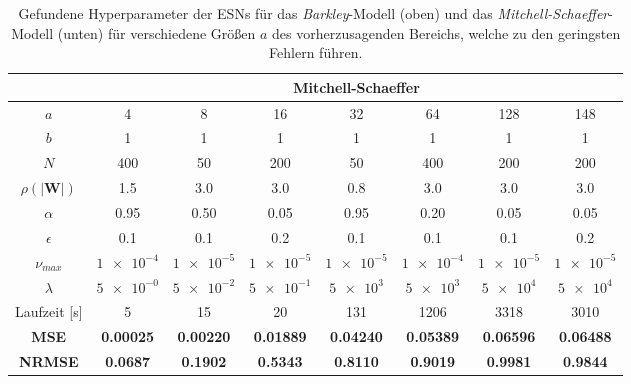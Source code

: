 \begin{table}[h]
	\begin{tabular}{|c|c|c|c|c|c|c|c|}
		\multicolumn{1}{c|}{} & \multicolumn{7}{c|}{Mitchell-Schaeffer}\\ 
		\hline \hline 
		\rule[-1ex]{0pt}{2.5ex} $a$ & 4 & 8 & 16 & 32 & 64 & 128 & 148\\ 
		\hline 
		\rule[-1ex]{0pt}{2.5ex} $b$ & 1 & 1 & 1 & 1 & 1 & 1 & 1 \\ 
		\hline 
		\rule[-1ex]{0pt}{3.5ex} $N$ & 400 & 50 & 200 & 50 & 400 & 200 & 200\\ 
		\hline 
		\rule[-1ex]{0pt}{3.5ex} $\rho(|\mathbf{W}|)$ & 1.5 & 3.0 & 3.0 & 0.8 & 3.0 & 3.0 & 3.0\\ 
		\hline 
		\rule[-1ex]{0pt}{3.5ex} $\alpha$ & 0.95 & 0.50 & 0.05 & 0.95 & 0.20 & 0.05 & 0.05 \\ 
		\hline 
		\rule[-1ex]{0pt}{3.5ex} $\epsilon$ & 0.1 & 0.1 & 0.2 & 0.1 & 0.1 & 0.1 & 0.2 \\ 
		\hline 
		\rule[-1ex]{0pt}{3.5ex} $\nu_{max}$ & $\num{1e-4}$ & $\num{1e-5}$ & $\num{1e-5}$ & $\num{1e-5}$ & $\num{1e-4}$ & $\num{1e-5}$ &  $\num{1e-5}$\\ 
		\hline 
		\rule[-1ex]{0pt}{3.5ex} $\lambda$ & $\num{5e-0}$ & $\num{5e-2}$ & $\num{5e-1}$ & $\num{5e+3}$ & $\num{5e+3}$ & $\num{5e+4}$ & $\num{5e+4}$\\ 		
		\hline 
		\rule[-1ex]{0pt}{2.5ex} Laufzeit [s] & 5 & 15 & 20 & 131 & 1206 & 3318 & 3010\\
		\hline 
		\rule[-1ex]{0pt}{2.5ex} \textbf{MSE} & \textbf{0.00025} & \textbf{0.00220} & \textbf{0.01889} & \textbf{0.04240} & \textbf{0.05389} & \textbf{0.06596} & \textbf{0.06488}\\ 
		\hline 
		\rule[-1ex]{0pt}{2.5ex} \textbf{NRMSE} & \textbf{0.0687} & \textbf{0.1902} & \textbf{0.5343} & \textbf{0.8110} & \textbf{0.9019} & \textbf{0.9981} & \textbf{0.9844} \\ 
		\hline 
	\end{tabular} 

	\caption{Gefundene Hyperparameter der \textsc{ESN}s für das \textit{Barkley}-Modell (oben) und das \textit{Mitchell-Schaeffer}-Modell (unten) für verschiedene Größen $a$ des vorherzusagenden Bereichs, welche zu den geringsten Fehlern führen.}
\label{tab:exp_inner_cross_esn_results}
\end{table}

